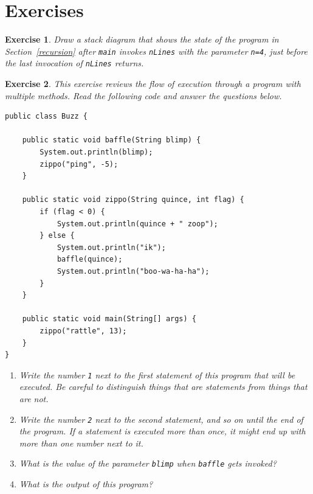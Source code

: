 \documentclass[12pt]{book}
\theoremstyle{exercise}
\newtheorem{exercise}{Exercise}[chapter]
\begin{document}
\section{Exercises}

\begin{exercise}
Draw a stack diagram that shows the state of the program in Section~\ref{recursion}
after {\tt main} invokes {\tt nLines} with the parameter {\tt n=4},
just before the last invocation of {\tt nLines} returns.
\end{exercise}

\begin{exercise}

This exercise reviews the flow of execution through a program
with multiple methods.  Read the following code and answer the
questions below.

\begin{lstlisting}
public class Buzz {

    public static void baffle(String blimp) {
        System.out.println(blimp);
        zippo("ping", -5);
    }

    public static void zippo(String quince, int flag) {
        if (flag < 0) {
            System.out.println(quince + " zoop");
        } else {
            System.out.println("ik");
            baffle(quince);
            System.out.println("boo-wa-ha-ha");
        }
    }

    public static void main(String[] args) {
        zippo("rattle", 13);
    }
}
\end{lstlisting}

\begin{enumerate}

\item Write the number {\tt 1} next to the first {\em statement}
of this program that will be executed.  Be careful to distinguish
things that are statements from things that are not.

\item Write the number {\tt 2} next to the second statement, and so on
until the end of the program.  If a statement is executed more than
once, it might end up with more than one number next to it.

\item What is the value of the parameter {\tt blimp} when {\tt baffle}
gets invoked?

\item What is the output of this program?

\end{enumerate}
\end{exercise}
\end{document}
